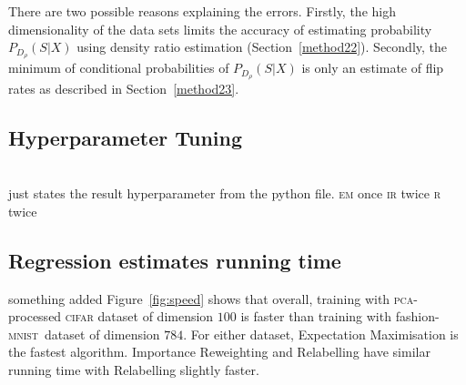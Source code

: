 \documentclass[12pt]{article} %
\newcommand{\mnist}{fashion-\textsc{mnist}}
\begin{document}
There are two possible reasons explaining the errors. 
Firstly, the high dimensionality of the data sets limits the accuracy of estimating probability~$P_{D_\rho}(S|X)$ using density ratio estimation  (Section~\ref{method22}). 
Secondly, the minimum of conditional probabilities of $P_{D_\rho}(S|X)$ is only an estimate of flip rates as described in Section~\ref{method23}.


\subsection{Hyperparameter Tuning}
{\color{red} \\
just states the result hyperparameter from the python file.}
\textsc{em} once
\textsc{ir} twice
\textsc{r} twice


\subsection{Regression estimates running time}
{\color{red} something added}
Figure~\ref{fig:speed} shows that overall, training with \textsc{pca}-processed \textsc{cifar} dataset of dimension $100$ is faster than training with \mnist\ dataset of dimension $784$. 
For either dataset, Expectation Maximisation is the fastest algorithm. Importance Reweighting and Relabelling have similar running time with Relabelling slightly faster.
\end{document}
